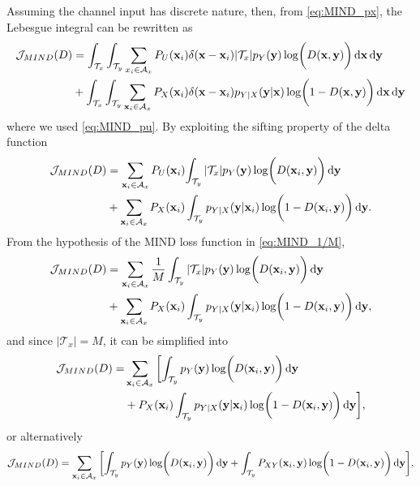 Assuming the channel input has discrete nature, 
then, from \eqref{eq:MIND_px}, the Lebesgue integral can be rewritten as
\begin{align}
    \mathcal{J}_{MIND}(D) &= \int_{\mathcal{T}_x} \int_{\mathcal{T}_y}{\sum_{x_i\in \mathcal{A}_x}{P_U(\mathbf{x}_i)\delta(\mathbf{x}-\mathbf{x}_i)}|\mathcal{T}_x|p_Y(\mathbf{y}) \log \biggl(D(\mathbf{x},\mathbf{y})\biggr)} \mathop{}\!\mathrm{d} \mathbf{x} \mathop{}\!\mathrm{d} \mathbf{y} \nonumber \\ 
    & +\int_{\mathcal{T}_x} \int_{\mathcal{T}_y}{\sum_{\mathbf{x}_i\in \mathcal{A}_x}{P_X(\mathbf{x}_i)\delta(\mathbf{x}-\mathbf{x}_i)} p_{Y|X}(\mathbf{y}|\mathbf{x}) \log \biggl(1-D(\mathbf{x},\mathbf{y})\biggr)} \mathop{}\!\mathrm{d} \mathbf{x} \mathop{}\!\mathrm{d} \mathbf{y}
\end{align}
where we used \eqref{eq:MIND_pu}.
By exploiting the sifting property of the delta function
\begin{align}
    \mathcal{J}_{MIND}(D) &=  {\sum_{\mathbf{x}_i\in \mathcal{A}_x}{P_U(\mathbf{x}_i)}{\int_{\mathcal{T}_y}|\mathcal{T}_x|p_Y(\mathbf{y}) \log \biggl(D(\mathbf{x}_i,\mathbf{y})\biggr)} \mathop{}\!\mathrm{d} \mathbf{y}}\nonumber \\
    & + {\sum_{\mathbf{x}_i\in \mathcal{A}_x}{P_X(\mathbf{x}_i)\int_{\mathcal{T}_y} p_{Y|X}(\mathbf{y}|\mathbf{x}_i) \log \biggl(1-D(\mathbf{x}_i,\mathbf{y})\biggr)} \mathop{}\!\mathrm{d} \mathbf{y}}.
\end{align}
From the hypothesis of the MIND loss function in \eqref{eq:MIND_1/M}, 
\begin{align}
    \mathcal{J}_{MIND}(D) &=  {\sum_{\mathbf{x}_i\in \mathcal{A}_x}{\frac{1}{M}\int_{\mathcal{T}_y}|\mathcal{T}_x|p_Y(\mathbf{y}) \log \biggl(D(\mathbf{x}_i,\mathbf{y})\biggr)} \mathop{}\!\mathrm{d} \mathbf{y}}\nonumber \\ 
    & + {\sum_{\mathbf{x}_i\in \mathcal{A}_x}{P_X(\mathbf{x}_i)\int_{\mathcal{T}_y} p_{Y|X}(\mathbf{y}|\mathbf{x}_i) \log \biggl(1-D(\mathbf{x}_i,\mathbf{y})\biggr)} \mathop{}\!\mathrm{d} \mathbf{y}},
\end{align}
 and since $|\mathcal{T}_x|=M$, it can be simplified into
\begin{align}
    \mathcal{J}_{MIND}(D) =  & \sum_{\mathbf{x}_i\in \mathcal{A}_x}{\biggl[\int_{\mathcal{T}_y}p_Y(\mathbf{y}) \log \biggl(D(\mathbf{x}_i,\mathbf{y})\biggr)\mathop{}\!\mathrm{d} \mathbf{y}} \nonumber \\
     & + P_X(\mathbf{x}_i)\int_{\mathcal{T}_y} p_{Y|X}(\mathbf{y}|\mathbf{x}_i) \log \biggl(1-D(\mathbf{x}_i,\mathbf{y})\biggr) \mathop{}\!\mathrm{d} \mathbf{y}\biggr],
\end{align}
or alternatively
\begin{equation}
\small
    \mathcal{J}_{MIND}(D) =  \sum_{\mathbf{x}_i\in \mathcal{A}_x}{\biggl[\int_{\mathcal{T}_y}p_Y(\mathbf{y}) \log \biggl(D(\mathbf{x}_i,\mathbf{y})\biggr)\mathop{}\!\mathrm{d} \mathbf{y} + \int_{\mathcal{T}_y} P_{XY}(\mathbf{x}_i,\mathbf{y}) \log \biggl(1-D(\mathbf{x}_i,\mathbf{y})\biggr) \mathop{}\!\mathrm{d} \mathbf{y}\biggr]},
\end{equation}
